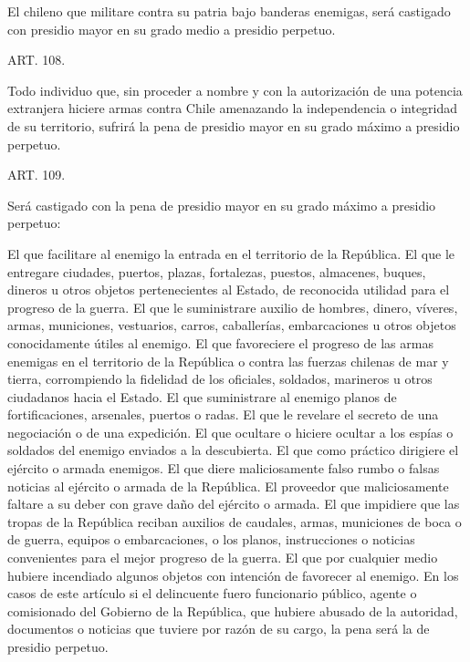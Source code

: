     El chileno que militare contra su patria bajo banderas enemigas, será castigado con presidio mayor en su grado medio a presidio perpetuo.



    ART. 108.

    Todo individuo que, sin proceder a nombre y con la autorización de una potencia extranjera hiciere armas contra Chile amenazando la independencia o integridad de su territorio, sufrirá la pena de presidio mayor en su grado máximo a presidio perpetuo.



    ART. 109.

    Será castigado con la pena de presidio mayor en su grado máximo a presidio perpetuo:

    El que facilitare al enemigo la entrada en el territorio de la República.
    El que le entregare ciudades, puertos, plazas, fortalezas, puestos, almacenes, buques, dineros u otros objetos pertenecientes al Estado, de reconocida utilidad para el progreso de la guerra.
    El que le suministrare auxilio de hombres, dinero, víveres, armas, municiones, vestuarios, carros, caballerías, embarcaciones u otros objetos conocidamente útiles al enemigo.
    El que favoreciere el progreso de las armas enemigas en el territorio de la República o contra las fuerzas chilenas de mar y tierra, corrompiendo la fidelidad de los oficiales, soldados, marineros u otros ciudadanos hacia el Estado.
    El que suministrare al enemigo planos de fortificaciones, arsenales, puertos o radas.
    El que le revelare el secreto de una negociación o de una expedición.
    El que ocultare o hiciere ocultar a los espías o soldados del enemigo enviados a la descubierta.
    El que como práctico dirigiere el ejército o armada enemigos.
    El que diere maliciosamente falso rumbo o falsas noticias al ejército o armada de la República.
    El proveedor que maliciosamente faltare a su deber con grave daño del ejército o armada.
    El que impidiere que las tropas de la República reciban auxilios de caudales, armas, municiones de boca o de guerra, equipos o embarcaciones, o los planos, instrucciones o noticias convenientes para el mejor progreso de la guerra.
    El que por cualquier medio hubiere incendiado algunos objetos con intención de favorecer al enemigo.
    En los casos de este artículo si el delincuente fuero funcionario público, agente o comisionado del Gobierno de la República, que hubiere abusado de la autoridad, documentos o noticias que tuviere por razón de su cargo, la pena será la de presidio perpetuo.





